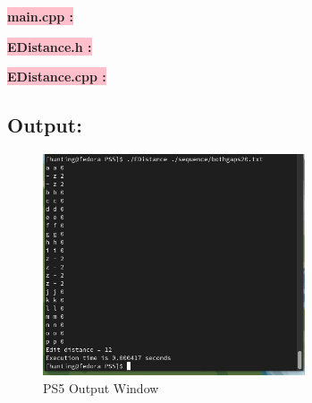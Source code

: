 \textbf{\colorbox{pink}{main.cpp :}} 


\textbf{\colorbox{pink}{EDistance.h :}}

\newpage

\textbf{\colorbox{pink}{EDistance.cpp :}} 




\subsection{Output:}
\begin{figure}[h]
   \centering
    \includegraphics[width=0.69\textwidth]{projectPictures/ps5.png}
    \caption{PS5 Output Window}
    \label{fig:ps5}
\end{figure}

\newpage
